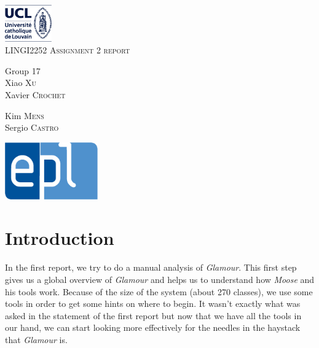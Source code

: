 \documentclass[11pt,a4paper]{article}
\begin{document}
\begin{titlepage}
\begin{center}
\includegraphics[width=0.15\textwidth]{UCL.png}
\vfill
\hrulefill
\\[1.2cm]
\textsc{\LARGE LINGI2252 Assignment 2 report}\\[1.2cm]
\hrulefill
\vfill
\begin{minipage}{0.4\textwidth}
\begin{flushleft} \large
Group 17\\
Xiao \textsc{Xu}\\ Xavier \textsc{Crochet}
\end{flushleft}
\end{minipage}
\begin{minipage}{0.4\textwidth}
\begin{flushright} \large
Kim \textsc{Mens} \\
Sergio \textsc{Castro} \\
\end{flushright}
\end{minipage}
\vfill
\includegraphics[width=0.30\textwidth]{EPL.jpg}\\
\vfill
\end{center}
\end{titlepage}


\tableofcontents
\newpage
\section{Introduction}
In the first report, we try to do a manual analysis of \textit{Glamour}. This first step gives us a global overview of \textit{Glamour} and helps us to understand how \textit{Moose} and his tools work. Because of the size of the system (about 270 classes), we use some tools in order to get some hints on where to begin. It wasn't exactly what was asked in the statement of the first report but now that we have all the tools in our hand, we can start looking more effectively for the needles in the haystack that \textit{Glamour} is.\\
\end{document}

